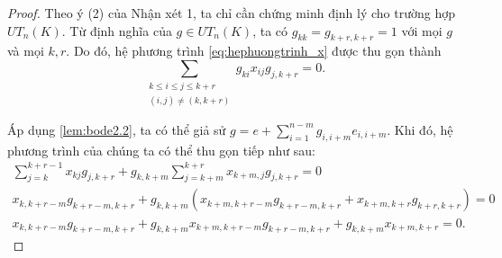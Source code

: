 \begin{proof}
Theo ý (2) của Nhận xét 1, ta chỉ cần chứng minh định lý cho trường hợp $UT_n(K)$. Từ định nghĩa của $g \in UT_n(K)$, ta có $g_{kk} = g_{k+r, k+r} = 1$ với mọi $g$ và mọi $k, r$. Do đó, hệ phương trình \cref{eq:hephuongtrinh_x} được thu gọn thành
\[ \sum_{\substack{k \leq i \leq j \leq k+r \\ (i,j) \neq (k, k+r)}} g_{ki} x_{ij} g_{j, k+r} = 0. \]

Áp dụng \cref{lem:bode2.2}, ta có thể giả sử $g = e + \sum_{i=1}^{n-m} g_{i, i+m} e_{i, i+m}$. Khi đó, hệ phương trình của chúng ta có thể thu gọn tiếp như sau:
\begin{gather*}
    \sum_{j=k}^{k+r-1} x_{kj} g_{j, k+r} + g_{k, k+m} \sum_{j=k+m}^{k+r} x_{k+m, j} g_{j, k+r} = 0\\
    x_{k, k+r-m} g_{k+r-m, k+r} + g_{k, k+m} \left( x_{k+m, k+r-m} g_{k+r-m, k+r} + x_{k+m, k+r} g_{k+r, k+r} \right) = 0\\
    x_{k, k+r-m} g_{k+r-m, k+r} + g_{k, k+m} x_{k+m, k+r-m} g_{k+r-m, k+r} + g_{k, k+m} x_{k+m, k+r} = 0.
\end{gather*}


\end{proof}

